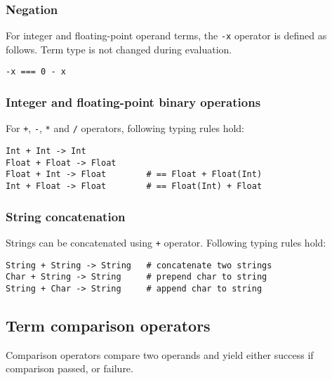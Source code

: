 \subsubsection{Negation}

For integer and floating-point operand terms, the \lstinline{-x} operator is defined as follows. Term type is not changed during evaluation.

\begin{lstlisting}
-x === 0 - x
\end{lstlisting}

\subsubsection{Integer and floating-point binary operations}

For \lstinline{+}, \lstinline{-}, \lstinline{*} and \lstinline{/} operators, following typing rules hold:

\begin{lstlisting}
Int + Int -> Int
Float + Float -> Float
Float + Int -> Float        # == Float + Float(Int)
Int + Float -> Float        # == Float(Int) + Float
\end{lstlisting}

\subsubsection{String concatenation}

Strings can be concatenated using \lstinline{+} operator. Following typing rules hold:

\begin{lstlisting}
String + String -> String   # concatenate two strings
Char + String -> String     # prepend char to string
String + Char -> String     # append char to string
\end{lstlisting}

\subsection{Term comparison operators}

Comparison operators compare two operands and yield either success if comparison passed, or failure.

